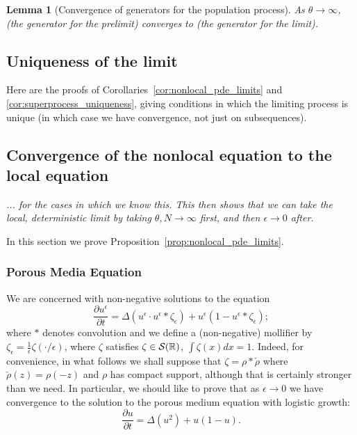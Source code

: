 \documentclass[12pt]{article}
\newtheorem{lemma}[theorem]{Lemma}
\newcommand{\IR}{\mathbb R}
\newcommand{\plr}[1]{\todo[inline]{Peter: #1}}
\newcommand{\comment}[1]{{\color{blue} \it #1}}
\begin{document}
    \begin{lemma}[Convergence of generators for the population process]
        As $\theta \to \infty$,
        \comment{(the generator for the prelimit)}
        converges to
        \comment{(the generator for the limit)}.
    \end{lemma}

\subsection{Uniqueness of the limit}
    \label{sec:uniqueness_proofs}

Here are the proofs of Corollaries~\ref{cor:nonlocal_pde_limits}
and \ref{cor:superprocess_uniqueness},
giving conditions in which the limiting process is unique
(in which case we have convergence, not just on subsequences).


\subsection{Convergence of the nonlocal equation to the local equation}

\comment{... for the cases in which we know this.
This then shows that we can take the local, deterministic limit
by taking $\theta, N \to \infty$ first, and then $\epsilon \to 0$ after.
}

In this section we prove Proposition~\ref{prop:nonlocal_pde_limits}.

\subsubsection{Porous Media Equation}

\plr{This is from pme.tex.}

We are concerned with non-negative solutions to the equation
\begin{equation}
\label{mollified equation}
\frac{\partial u^\epsilon}{\partial t}=
\Delta\left(u^\epsilon \cdot u^\epsilon *\zeta_\epsilon\right)
+u^\epsilon\left(1-u^\epsilon*\zeta_\epsilon\right);
\end{equation}
where $*$ denotes convolution and we define
a (non-negative) mollifier by
$\zeta_\epsilon=\frac{1}{\epsilon}\zeta(\cdot/\epsilon)$, where $\zeta$
satisfies
$\zeta\in\cal{S}(\IR)$, $\int\zeta(x)dx=1$. Indeed, for convenience, in
what follows we shall suppose that $\zeta =\rho*\check{\rho}$ where
$\check{\rho}(z)=\rho(-z)$ and $\rho$ has
compact support, although that
is certainly stronger than we need.
In particular, we should like to prove that as $\epsilon\to 0$ we have
convergence to the solution to the porous medium equation with
logistic growth:
\begin{equation}
\label{PME}
\frac{\partial u}{\partial t}=
\Delta\left(u^2\right)
+u\left(1-u\right).
\end{equation}
\end{document}
